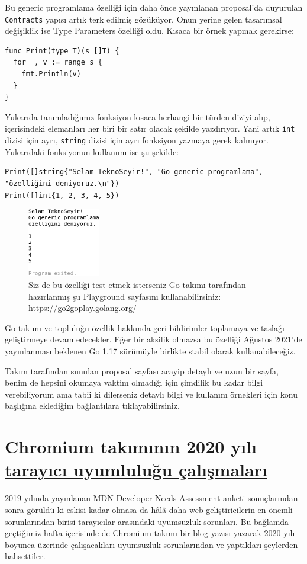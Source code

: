 \documentclass[11pt]{article}
\begin{document}
Bu generic programlama özelliği için daha önce yayınlanan proposal'da
duyurulan \texttt{Contracts} yapısı artık terk edilmiş gözüküyor. Onun yerine gelen
tasarımsal değişiklik ise Type Parameters özelliği oldu. Kısaca bir örnek
yapmak gerekirse:
\begin{verbatim}
func Print(type T)(s []T) {
  for _, v := range s {
    fmt.Println(v)
  }
}
\end{verbatim}

Yukarıda tanımladığımız fonksiyon kısaca herhangi bir türden diziyi alıp,
içerisindeki elemanları her biri bir satır olacak şekilde yazdırıyor. Yani
artık \texttt{int} dizisi için ayrı, \texttt{string} dizisi için ayrı fonksiyon yazmaya
gerek kalmıyor. Yukarıdaki fonksiyonun kullanımı ise şu şekilde:

\begin{verbatim}
Print([]string{"Selam TeknoSeyir!", "Go generic programlama", "özelliğini deniyoruz.\n"})
Print([]int{1, 2, 3, 4, 5})
\end{verbatim}

\begin{figure}[htbp]
\centering
\includegraphics[height=3cm]{gorseller/go-generic-programlama.png}
\caption[\emph{/go2goplay.golang.org}]{Siz de bu özelliği test etmek isterseniz Go takımı tarafından hazırlanmış şu Playground sayfasını kullanabilirsiniz: \url{https://go2goplay.golang.org/}}
\end{figure}

Go takımı ve topluluğu özellik hakkında geri bildirimler toplamaya ve taslağı
geliştirmeye devam edecekler. Eğer bir aksilik olmazsa bu özelliği Ağustos
2021'de yayınlanması beklenen Go 1.17 sürümüyle birlikte stabil olarak
kullanabileceğiz.

Takım tarafından sunulan proposal sayfası acayip detaylı ve uzun bir sayfa,
benim de hepsini okumaya vaktim olmadığı için şimdilik bu kadar bilgi
verebiliyorum ama tabii ki dilerseniz detaylı bilgi ve kullanım örnekleri için
konu başlığına eklediğim bağlantılara tıklayabilirsiniz.
\section{Chromium takımının 2020 yılı \href{https://blog.chromium.org/2020/06/improving-chromiums-browser.html}{tarayıcı uyumluluğu çalışmaları}}
\label{sec:orgfc2cc57}
2019 yılında yayınlanan \href{https://insights.developer.mozilla.org/}{MDN Developer Needs Assessment} anketi sonuçlarından
sonra görüldü ki eskisi kadar olmasa da hâlâ daha web geliştiricilerin en
önemli sorunlarından birisi tarayıcılar arasındaki uyumsuzluk sorunları. Bu
bağlamda geçtiğimiz hafta içerisinde de Chromium takımı bir blog yazısı
yazarak 2020 yılı boyunca üzerinde çalışacakları uyumsuzluk sorunlarından ve
yaptıkları şeylerden bahsettiler.
\end{document}
